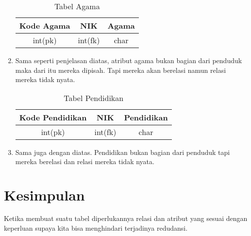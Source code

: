 \documentclass{article}
\begin{document}
\begin{enumerate}
\begin{table}[h]
\begin{center}
\begin{tabular}{|c|c|c|}
\hline
Kode Agama & NIK & Agama\\
\hline
int(pk) & int(fk) & char\\
\hline
\end{tabular}
\caption{Tabel Agama}
\end{center}
\end{table}
\item Sama seperti penjelasan diatas, atribut agama bukan bagian dari penduduk maka dari itu mereka dipisah. Tapi mereka akan berelasi namun relasi mereka tidak nyata.

\begin{table}[h]
\begin{center}
\begin{tabular}{|c|c|c|}
\hline
Kode Pendidikan & NIK & Pendidikan\\
\hline
int(pk) & int(fk) & char\\
\hline
\end{tabular}
\caption{Tabel Pendidikan}
\end{center}
\end{table}
\item Sama juga dengan diatas. Pendidikan bukan bagian dari penduduk tapi mereka berelasi dan relasi mereka tidak nyata.
\end{enumerate}

\newpage
\part{Kesimpulan}
Ketika membuat suatu tabel diperlukannya relasi dan atribut yang sesuai dengan keperluan supaya kita bisa menghindari terjadinya redudansi.
\end{document}
